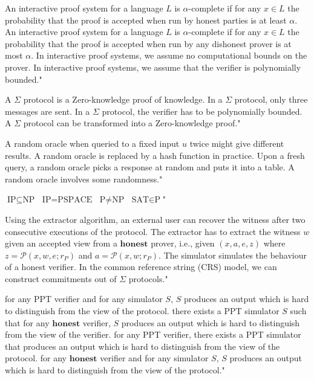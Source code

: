 {An interactive proof system for a language $L$ is $\alpha$-complete if for any $x\in L$ the probability that the proof is accepted when run by honest parties is at least $\alpha$.}
{An interactive proof system for a language $L$ is $\alpha$-complete if for any $x\in L$ the probability that the proof is accepted when run by any dishonest prover is at most $\alpha$.}
{In interactive proof systems, we assume no computational bounds on the prover.}
{In interactive proof systems, we assume that the verifier is polynomially bounded."}

{A $\Sigma$ protocol is a Zero-knowledge proof of knowledge.}
{In a $\Sigma$ protocol, only three messages are sent.}
{In a $\Sigma$ protocol, the verifier has to be polynomially bounded.}
{A $\Sigma$ protocol can be transformed into a Zero-knowledge proof."}

{A random oracle when queried to a fixed input $u$ twice might give different results.}
{A random oracle is replaced by a hash function in practice.}
{Upon a fresh query, a random oracle picks a response at random and puts it into a table.}
{A random oracle involves some randomness."}

{$\textrm{IP} \subseteq \textrm{NP}$}
{$\textrm{IP} = \textrm{PSPACE}$}
{$\textrm{P} \neq \textrm{NP}$}
{$\textrm{SAT} \in \textrm{P}$"}

{Using the extractor algorithm, an external user can recover the witness after two consecutive executions of the protocol.}
{The extractor has to extract the witness $w$ given an accepted view from a $ \textbf{honest} $ prover, i.e., given $(x,a,e,z)$ where $z = \mathcal{P}(x,w,e;r_P)$ and $a = \mathcal{P}(x,w;r_P)$.}
{The simulator simulates the behaviour of a honest verifier.}
{In the common reference string (CRS) model, we can construct commitments out of $\Sigma$ protocols."}

{for any PPT verifier and for any simulator $S$, $S$ produces an output which is hard to distinguish from the view of the protocol.}
{there exists a PPT simulator $S$ such that for any $ \textbf{honest} $ verifier, $S$ produces an output which is hard to distinguish from the view of the verifier.}
{for any PPT verifier, there exists a PPT simulator that produces an output which is hard to distinguish from the view of the protocol.}
{for any $ \textbf{honest} $ verifier and for any simulator $S$, $S$ produces an output which is hard to distinguish from the view of the protocol."}

